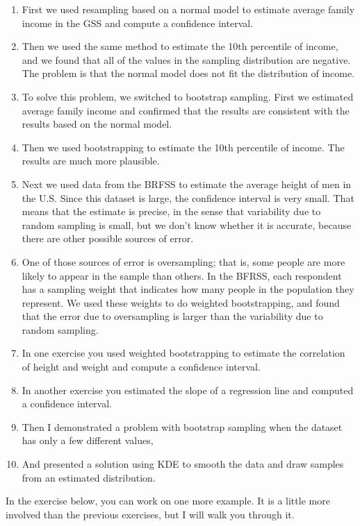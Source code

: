 \begin{enumerate}
\def\labelenumi{\arabic{enumi}.}
\item
  First we used resampling based on a normal model to estimate average
  family income in the GSS and compute a confidence interval.
\item
  Then we used the same method to estimate the 10th percentile of
  income, and we found that all of the values in the sampling
  distribution are negative. The problem is that the normal model does
  not fit the distribution of income.
\item
  To solve this problem, we switched to bootstrap sampling. First we
  estimated average family income and confirmed that the results are
  consistent with the results based on the normal model.
\item
  Then we used bootstrapping to estimate the 10th percentile of income.
  The results are much more plausible.
\item
  Next we used data from the BRFSS to estimate the average height of men
  in the U.S. Since this dataset is large, the confidence interval is
  very small. That means that the estimate is precise, in the sense that
  variability due to random sampling is small, but we don't know whether
  it is accurate, because there are other possible sources of error.
\item
  One of those sources of error is oversampling; that is, some people
  are more likely to appear in the sample than others. In the BFRSS,
  each respondent has a sampling weight that indicates how many people
  in the population they represent. We used these weights to do weighted
  bootstrapping, and found that the error due to oversampling is larger
  than the variability due to random sampling.
\item
  In one exercise you used weighted bootstrapping to estimate the
  correlation of height and weight and compute a confidence interval.
\item
  In another exercise you estimated the slope of a regression line and
  computed a confidence interval.
\item
  Then I demonstrated a problem with bootstrap sampling when the dataset
  has only a few different values,
\item
  And presented a solution using KDE to smooth the data and draw samples
  from an estimated distribution.
\end{enumerate}

In the exercise below, you can work on one more example. It is a little
more involved than the previous exercises, but I will walk you through
it.

